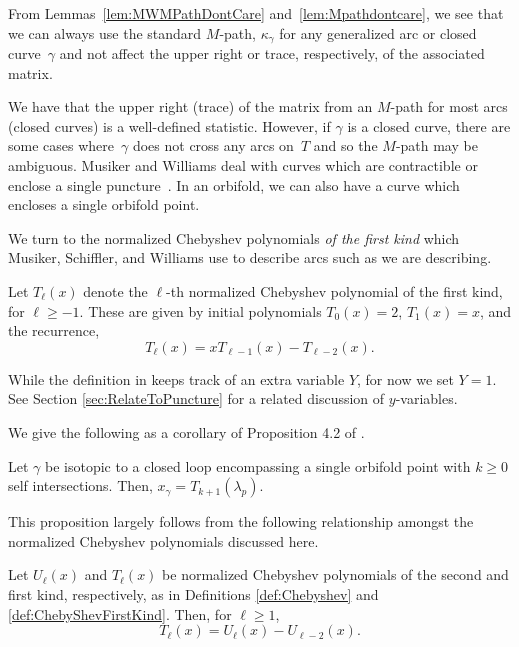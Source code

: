 From Lemmas~\ref{lem:MWMPathDontCare} and~\ref{lem:Mpathdontcare}, we see that we can always use the standard $M$-path, $\kappa_\gamma$ for any generalized arc or closed curve~$\gamma$ and not affect the upper right or trace, respectively, of the associated matrix.

We have that the upper right (trace) of the matrix from an $M$-path for most arcs (closed curves) is a well-defined statistic. However, if $\gamma$ is a closed curve, there are some cases where~$\gamma$ does not cross any arcs on~$T$ and so the $M$-path may be ambiguous. Musiker and Williams deal with curves which are contractible or enclose a single puncture~\cite{MW}. In an orbifold, we can also have a curve which encloses a single orbifold point.

 We turn to the normalized Chebyshev polynomials \emph{of the first kind} which Musiker, Schiffler, and Williams use to describe arcs such as we are describing.

\begin{Definition}\label{def:ChebyShevFirstKind}
Let $T_\ell(x)$ denote the $\ell$-th norma\-lized Chebyshev polynomial of the first kind, for $\ell \geq -1$. These are given by initial polynomials $T_{0}(x) = 2$, $T_1(x) = x$, and the recurrence,
\[
T_\ell(x) = xT_{\ell-1}(x) - T_{\ell-2}(x).
\]
\end{Definition}

While the definition in \cite{MSW-bases} keeps track of an extra variable $Y$, for now we set $Y = 1$. See Section \ref{sec:RelateToPuncture} for a related discussion of $y$-variables.

We give the following as a corollary of Proposition 4.2 of \cite{MSW-bases}.

\begin{Proposition}\label{prop:MSWChebyshev}
Let $\gamma$ be isotopic to a closed loop encompassing a single orbifold point with $k\geq 0$ self intersections. Then, $x_\gamma = T_{k+1}(\lambda_p)$.
\end{Proposition}

This proposition largely follows from the following relationship amongst the normalized Chebyshev polynomials discussed here.

\begin{Lemma}\label{lem:RelatingChebyshev}
Let $U_\ell(x)$ and $T_\ell(x)$ be normalized Chebyshev polynomials of the second and first kind, respectively, as in Definitions {\rm \ref{def:Chebyshev}} and {\rm \ref{def:ChebyShevFirstKind}}. Then, for $\ell \geq 1$, \[
T_\ell(x) = U_\ell(x) - U_{\ell-2}(x).
\]
\end{Lemma}

